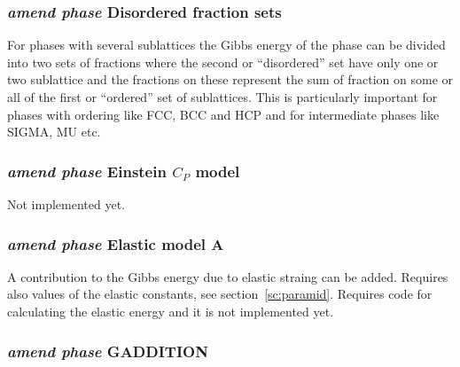 \documentclass[12pt]{article}
\begin{document}
\subsubsection{{\em amend phase} Disordered fraction sets}

For phases with several sublattices the Gibbs energy of the phase can
be divided into two sets of fractions where the second or
``disordered'' set have only one or two sublattice and the fractions
on these represent the sum of fraction on some or all of the first or
``ordered'' set of sublattices.  This is particularly important for
phases with ordering like FCC, BCC and HCP and for intermediate phases
like SIGMA, MU etc.

\subsubsection{{\em amend phase} Einstein $C_P$ model}

Not implemented yet.

\subsubsection{{\em amend phase} Elastic model A}

A contribution to the Gibbs energy due to elastic straing can be
added.  Requires also values of the elastic constants, see
section~\ref{sc:paramid}.  Requires code for calculating the
elastic energy and it is not implemented yet.

\subsubsection{{\em amend phase} GADDITION}
\end{document}
